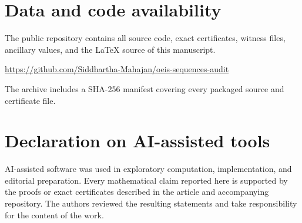 \documentclass[11pt]{article}
\theoremstyle{definition}
\newcommand{\repo}{\url{https://github.com/Siddhartha-Mahajan/oeis-sequences-audit}}
\begin{document}
\setcounter{page}{1}
\tableofcontents
\clearpage
{}











\appendix




\section*{Data and code availability}
The public repository contains all source code, exact certificates, witness
files, ancillary values, and the LaTeX source of this manuscript.
\begin{center}
{\footnotesize\repo}
\end{center}
The archive includes a SHA-256 manifest covering every packaged source and
certificate file.

\section*{Declaration on AI-assisted tools}
AI-assisted software was used in exploratory computation, implementation, and
editorial preparation.  Every mathematical claim reported here is supported
by the proofs or exact certificates described in the article and accompanying
repository.  The authors reviewed the resulting statements and take
responsibility for the content of the work.


\begingroup
\small
\setlength{\bibsep}{0.25em}


\endgroup
\end{document}
